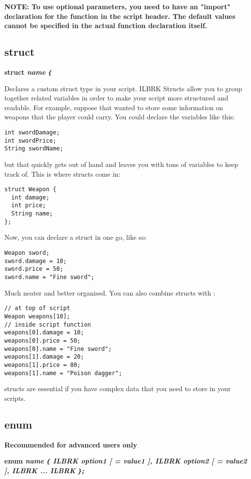 \bf{NOTE:} To use optional parameters, you need to have an "import" declaration for the function
in the script header. The default values cannot be specified in the actual function declaration
itself.


\subsection{struct}\label{struct}%

\bf{struct} \it{name} \verb${$

Declares a custom struct type in your script. ILBRK
Structs allow you to group together related variables in order to make your
script more structured and readable. For example, suppose that wanted to store
some information on weapons that the player could carry. You could declare
the variables like this:
\begin{verbatim}
int swordDamage;
int swordPrice;
String swordName;
\end{verbatim}
but that quickly gets out of hand and leaves you with tons of variables to keep track of.
This is where structs come in:
\begin{verbatim}
struct Weapon {
  int damage;
  int price;
  String name;
};
\end{verbatim}
Now, you can declare a struct in one go, like so:
\begin{verbatim}
Weapon sword;
sword.damage = 10;
sword.price = 50;
sword.name = "Fine sword";
\end{verbatim}
Much neater and better organised. You can also combine structs with :
\begin{verbatim}
// at top of script
Weapon weapons[10];
// inside script function
weapons[0].damage = 10;
weapons[0].price = 50;
weapons[0].name = "Fine sword";
weapons[1].damage = 20;
weapons[1].price = 80;
weapons[1].name = "Poison dagger";
\end{verbatim}
structs are essential if you have complex data that you need to store in your scripts.


\subsection{enum}\label{enum}%

\bf{Recommended for advanced users only}

\bf{enum} \it{name} \verb${$ ILBRK
  \it{option1} [ = \it{value1} ], ILBRK
  \it{option2} [ = \it{value2} ], ILBRK
  ... ILBRK
\verb$};$

